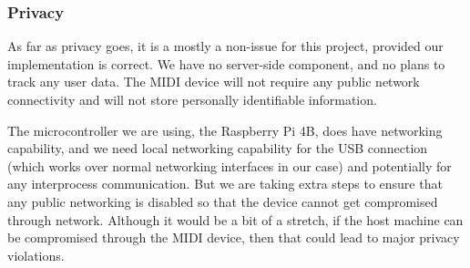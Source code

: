 \subsubsection{Privacy}

As far as privacy goes, it is a mostly a non-issue for this project, provided our
implementation is correct. We have no server-side component, and no plans to track any
user data. The MIDI device will not require any public network connectivity and will not
store personally identifiable information.

The microcontroller we are using, the Raspberry Pi 4B, does have networking capability,
and we need local networking capability for the USB connection (which works over normal
networking interfaces in our case) and potentially for any interprocess communication.
But we are taking extra steps to ensure that any public networking is disabled so that the
device cannot get compromised through network. Although it would be a bit of a stretch, if
the host machine can be compromised through the MIDI device, then that could lead to major
privacy violations.